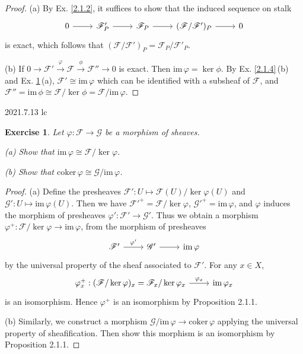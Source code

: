 \documentclass{amsart}
\newtheorem{exe}{Exercise}[subsection]
\theoremstyle{remark}\newtheorem{rmk}[theorem]{Remark}
\begin{document}
\begin{proof}
   (a) By Ex. \ref{2.1.2}, it suffices to show that the induced sequence on stalk
   \begin{equation*}
   	\begin{tikzcd}
   		0 \arrow[r] & \mathscr{F}^{\prime}_P \arrow[r] & \mathscr{F}_P \arrow[r] & (\mathscr{F}/\mathscr{F}^{\prime})_P \arrow[r] & 0
   	\end{tikzcd}
   \end{equation*}
   is exact, which follows that $(\mathscr{F}/\mathscr{F}')_{P}=\mathscr{F}_P/\mathscr{F}'_P$.
   
   (b) If $0 \rightarrow \mathscr{F}' \xrightarrow{\varphi} \mathscr{F} \xrightarrow{\phi} \mathscr{F}'' \rightarrow 0$ is exact. Then $\mathrm{im}\,{\varphi} = \ker{\phi}$. By Ex. \ref{2.1.4}\,(b) and Ex. \ref{2.1.7}\,(a), $\mathscr{F}'\cong\mathrm{im}\,\varphi$ which can be identified with a subsheaf of $\mathscr{F}$, and $\mathscr{F}''=\mathrm{im}\,\phi\cong \mathscr{F}/\ker\phi=\mathscr{F}/\mathrm{im}\,\varphi$.
\end{proof}

2021.7.13 lc
\begin{exe}
	\label{2.1.7}
	Let $\varphi:\mathscr{F}\to\mathscr{G}$ be a morphism of sheaves.
	
	(a) Show that $\mathrm{im}\,\varphi\cong\mathscr{F}/\ker\varphi$.
	
	(b) Show that $\mathrm{coker}\,\varphi\cong\mathscr{G}/\mathrm{im}\,\varphi$.
\end{exe}

\begin{proof}
	(a) Define the presheaves $\mathscr{F}':U\mapsto\mathscr{F}(U)/\ker\varphi(U)$ and $\mathscr{G}':U\mapsto\mathrm{im}\,\varphi(U)$. Then we have $\mathscr{F}'^+=\mathscr{F}/\ker\varphi$, $\mathscr{G}'^+=\mathrm{im}\,\varphi$, and $\varphi$ induces the morphism of presheaves $\varphi':\mathscr{F}'\to\mathscr{G}'$. Thus we obtain a morphism $\varphi^+:\mathscr{F}/\ker\varphi\rightarrow\mathrm{im}\,\varphi$, from the morphism of presheaves 
	\begin{equation*}
		\begin{tikzcd}
			\mathscr{F}^{\prime} \arrow[r, "\varphi^{\prime}"] & \mathscr{G}^{\prime} \arrow[r] & {\mathrm{im}\,\varphi}
		\end{tikzcd}
	\end{equation*}
	by the universal property of the sheaf associated to $\mathscr{F}'$. For any $x\in X$,
	\begin{equation*}
		\begin{tikzcd}
			\varphi^+_x:(\mathscr{F}/\ker\varphi)_x=\mathscr{F}_x/\ker\varphi_x \arrow[r, "\varphi_x"] & {\mathrm{im}\,\varphi_x}
		\end{tikzcd}
	\end{equation*}
	is an isomorphism. Hence $\varphi^+$ is an isomorphism by Proposition 2.1.1.
	
	(b) Similarly, we construct a morphism $\mathscr{G}/\mathrm{im}\,\varphi\to\mathrm{coker}\,\varphi$ applying the universal property of sheafification. Then show this morphism is an isomorphism by Proposition 2.1.1.
\end{proof}
\end{document}
